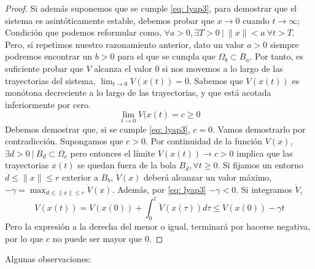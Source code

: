 \begin{proof}
Si además suponemos que se cumple \ref{eq: lyap3}, para demostrar que el sistema es asintóticamente estable, debemos probar que $x \to 0$ cuando $t \to \infty$; Condición que podemos reformular como, $\forall a >0, \exists T>0\ | \ \|x\| < a \ \forall t>T$. Pero, si repetimos nuestro razonamiento anterior, dato un valor $a>0$ siempre podremos encontrar un $b>0$ para el que se cumpla que $ \Omega_b \subset B_a$. Por tanto, es suficiente probar que $V$ alcanza el valor $0$ si nos movemos a lo largo de las trayectorias del sistema, $\lim_{t \to 0}V(x(t))=0$. Sabemos que $V(x(t))$ es monótona decreciente a lo largo de las trayectorias, y que está acotada inferiormente por cero.
\begin{equation}
\lim_{t \to 0}V(x(t)=c \geq 0
\end{equation}
Debemos demostrar que,  si se cumple \ref{eq: lyap3}, $c=0$. Vamos  demostrarlo por contradicción. Supongamos que $c>0$. Por continuidad de la función $V(x)$, $\exists d>0\ | \ B_d \subset \Omega_c$ pero entonces el límite $V(x(t))\to c>0$ implica que las trayectorias $x(t)$ se quedan fuera de la bola $B_d, \forall t \geq 0$. Si fijamos  un entorno $d \leq \|x\| \leq r$ exterior a $B_b$, $\dot V(x)$ deberá alcanzar un valor máximo, $-\gamma =\max_{d \leq \| x \| \leq r} \dot{V}(x)$. Además, por \ref{eq: lyap3} $-\gamma < 0$. Si integramos $\dot V$,
\begin{equation*}
V(x(t)) = V(x(0)) + \int_0^t \dot V(x(\tau))d\tau \leq V(x(0)) -\gamma t
\end{equation*}
Pero la expresión a la derecha del menor o igual, terminará por hacerse negativa, por lo que $c$ no puede ser mayor que 0.
\end{proof}
Algunas observaciones:
